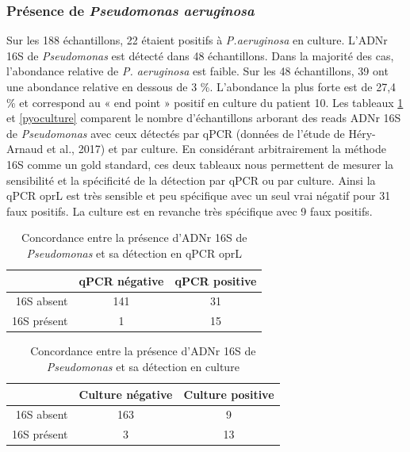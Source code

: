 \documentclass[12pt,a4paper]{article}
\begin{document}
{\subsubsection{Présence de \textit{Pseudomonas aeruginosa}}
Sur les 188 échantillons, 22 étaient positifs à \textit{P.aeruginosa} en culture. L'ADNr 16S de \textit{Pseudomonas} est détecté dans 48 échantillons. Dans la majorité des cas, l'abondance relative de \textit{P. aeruginosa} est faible. Sur les 48 échantillons, 39 ont une abondance relative en dessous de 3 \%. L'abondance la plus forte est de 27,4 \% et correspond au « end point » positif en culture du patient 10.
Les tableaux \ref{pyopcr} et \ref{pyoculture} comparent le nombre d'échantillons arborant des reads ADNr 16S de \textit{Pseudomonas} avec ceux détectés par qPCR (données de l'étude de Héry-Arnaud et al., 2017\cite{Hery-Arnaud2017}) et par culture. 
En considérant arbitrairement la méthode 16S comme un gold standard, ces deux tableaux nous permettent de mesurer la sensibilité et la spécificité de la détection par qPCR ou par culture. 
Ainsi la qPCR oprL est très sensible et peu spécifique  avec un seul vrai négatif pour 31 faux positifs. 
La culture est en revanche très spécifique avec 9 faux positifs. 

  \begin{table}[!h]
      \centering
            \caption{Concordance entre la présence d'ADNr 16S de \textit{Pseudomonas} et sa détection en qPCR oprL}

      \begin{tabular}{r|c|c}
           & qPCR négative  & qPCR positive \\
           \hline
           16S absent & 141 & 31 \\
           16S présent & 1 & 15   \\

      \end{tabular}
      \label{pyopcr}
  \end{table}

  \begin{table}[!h]
      \centering
         \caption{Concordance entre la présence d'ADNr 16S de \textit{Pseudomonas} et sa détection en culture}
      \begin{tabular}{r|c|c}
           & Culture négative  & Culture positive \\
           \hline
           16S absent & 163 & 9 \\
           16S présent & 3 & 13   \\
      \end{tabular}
   

\end{table}}
\end{document}
